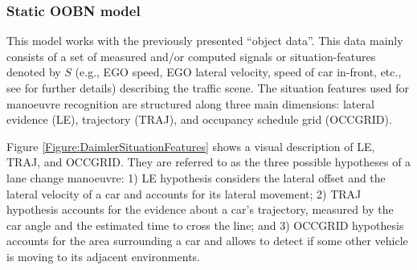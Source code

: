 \subsubsection*{Static OOBN model}

This model works with the previously presented ``object data''. This data mainly consists of a set of measured and/or computed signals or situation-features denoted by $S$ (e.g., EGO speed, EGO lateral velocity, speed of car in-front, etc., see \cite{kasper2012object} for further details) describing the traffic scene. The situation features used for manoeuvre recognition are structured along three main dimensions: lateral evidence (LE), trajectory (TRAJ), and occupancy schedule grid (OCCGRID).  

Figure \ref{Figure:DaimlerSituationFeatures} shows a visual description of LE, TRAJ, and OCCGRID. They are referred to as the three possible hypotheses of a lane change manoeuvre: 1) LE hypothesis considers the lateral offset and the lateral velocity of a car and accounts for its lateral movement; 2) TRAJ hypothesis accounts for the evidence about a car's trajectory, measured by the car angle and the estimated time to cross the line; and 3) OCCGRID hypothesis accounts for the area surrounding a car and allows to detect if some other vehicle is moving to its adjacent environments.

